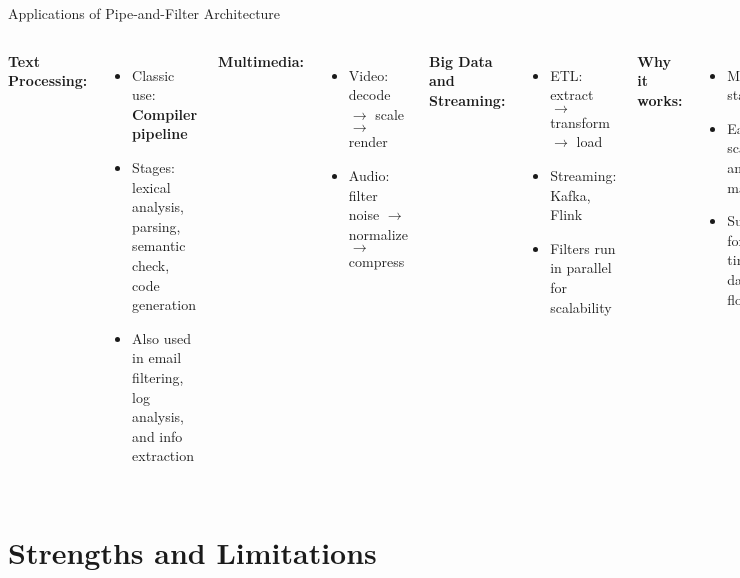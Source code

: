 \documentclass[aspectratio=169, table]{beamer}
\begin{document}
\begin{frame}[fragile]{Applications of Pipe-and-Filter Architecture}
	\vspace{20pt}
	\begin{columns}[T]
		\textbf{Text Processing:}
		\begin{itemize}
			\item Classic use: \textbf{Compiler pipeline}
			\item Stages: lexical analysis, parsing, semantic check, code generation
			\item Also used in email filtering, log analysis, and info extraction
		\end{itemize}
		
		\textbf{Multimedia:}
		\begin{itemize}
			\item Video: decode $\rightarrow$ scale $\rightarrow$ render
			\item Audio: filter noise $\rightarrow$ normalize $\rightarrow$ compress
		\end{itemize}
		
		\textbf{Big Data and Streaming:}
		\begin{itemize}
			\item ETL: extract $\rightarrow$ transform $\rightarrow$ load
			\item Streaming: Kafka, Flink
			\item Filters run in parallel for scalability
		\end{itemize}
		
		\textbf{Why it works:}
		\begin{itemize}
			\item Modular stages
			\item Easy to scale and maintain
			\item Suitable for real-time data flow
		\end{itemize}
	\end{columns}
\end{frame}

\section{Strengths and Limitations}
\end{document}
